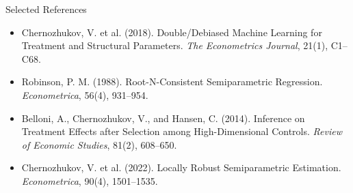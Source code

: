 \documentclass[aspectratio=169,11pt]{beamer}
\begin{document}
\begin{frame}{Selected References}
\small
\begin{itemize}
\item Chernozhukov, V. et al. (2018). Double/Debiased Machine Learning for Treatment and Structural Parameters. \textit{The Econometrics Journal}, 21(1), C1--C68.
\item Robinson, P. M. (1988). Root-N-Consistent Semiparametric Regression. \textit{Econometrica}, 56(4), 931--954.
\item Belloni, A., Chernozhukov, V., and Hansen, C. (2014). Inference on Treatment Effects after Selection among High-Dimensional Controls. \textit{Review of Economic Studies}, 81(2), 608--650.
\item Chernozhukov, V. et al. (2022). Locally Robust Semiparametric Estimation. \textit{Econometrica}, 90(4), 1501--1535.
\end{itemize}
\end{frame}

\contactslide
\end{document}
